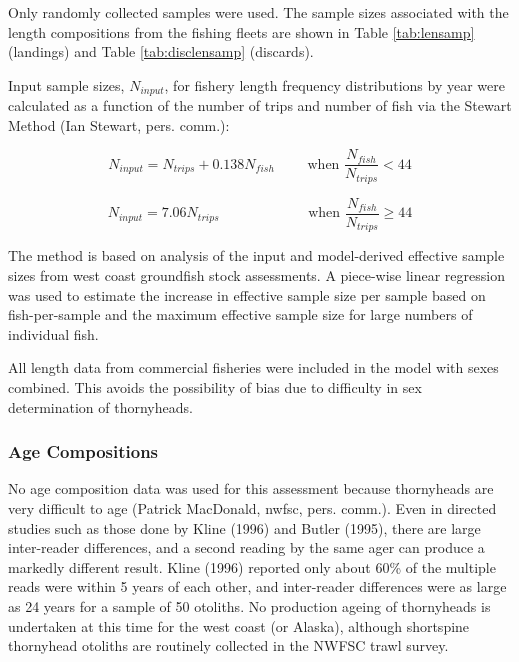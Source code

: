 \documentclass[11pt,
  letterpaper,
]{article}
\begin{document}
Only randomly collected samples were used. The sample sizes associated with the length compositions from the fishing fleets are shown in Table \ref{tab:lensamp} (landings) and Table \ref{tab:disclensamp} (discards).

Input sample sizes, \({N_{input}}\), for fishery length frequency distributions by year were calculated as a function of the number of trips and number of fish via the Stewart Method (Ian Stewart, pers. comm.):

\begin{equation} {N_{input} = N_{trips} + 0.138N_{fish}}\qquad\text{ when }\frac{N_{fish}}{N_{trips}}<44 \end{equation}

\begin{equation} {N_{input} = 7.06N_{trips}}\qquad\qquad\qquad\text{ when }\frac{N_{fish}}{N_{trips}}\ge 44 \end{equation}

The method is based on analysis of the input and model-derived effective sample sizes from west coast groundfish stock assessments. A piece-wise linear regression was used to estimate the increase in effective sample size per sample based on fish-per-sample and the maximum effective sample size for large numbers of individual fish.

All length data from commercial fisheries were included in the model with sexes combined. This avoids the possibility of bias due to difficulty in sex determination of thornyheads.

\hypertarget{age-compositions}{%
\subsubsection{Age Compositions}\label{age-compositions}}

No age composition data was used for this assessment because thornyheads are very difficult to age (Patrick MacDonald, \gls{nwfsc}, pers. comm.). Even in directed studies such as those done by Kline (1996) and Butler (1995), there are large inter-reader differences, and a second reading by the same ager can produce a markedly different result. Kline (1996) reported only about 60\% of the multiple reads were within 5 years of each other, and inter-reader differences were as large as 24 years for a sample of 50 otoliths. No production ageing of thornyheads is undertaken at this time for the west coast (or Alaska), although shortspine thornyhead otoliths are routinely collected in the NWFSC trawl survey.
\end{document}

